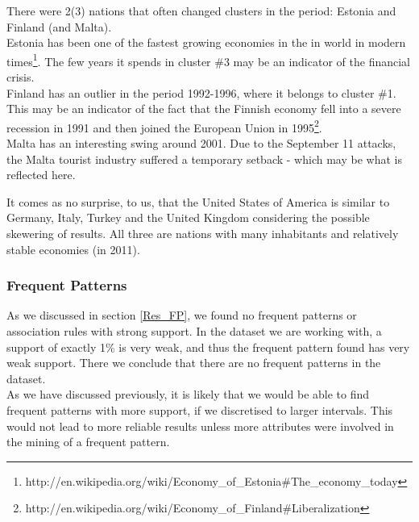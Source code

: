 There were 2(3) nations that often changed clusters in the period: Estonia and Finland (and Malta).
\\Estonia has been one of the fastest growing economies in the in world in modern times\footnote{http://en.wikipedia.org/wiki/Economy\_of\_Estonia\#The\_economy\_today}. The few years it spends in cluster \#3 may be an indicator of the financial crisis.
\\Finland has an outlier in the period 1992-1996, where it belongs to cluster \#1. This may be an indicator of the fact that the Finnish economy fell into a severe recession in 1991 and then joined the European Union in 1995\footnote{http://en.wikipedia.org/wiki/Economy\_of\_Finland\#Liberalization}.
\\Malta has an interesting swing around 2001. Due to the September 11 attacks, the Malta tourist industry suffered a temporary setback - which may be what is reflected here.

It comes as no surprise, to us, that the United States of America is similar to Germany, Italy, Turkey and the United Kingdom considering the possible skewering of results. All three are nations with many inhabitants and relatively stable economies (in 2011).

\subsubsection*{Frequent Patterns}
As we discussed in section \ref{Res_FP}, we found no frequent patterns or association rules with strong support. In the dataset we are working with, a support of exactly 1\% is very weak, and thus the frequent pattern found has very weak support. There we conclude that there are no frequent patterns in the dataset.
\\As we have discussed previously, it is likely that we would be able to find frequent patterns with more support, if we discretised to larger intervals. This would not lead to more reliable results unless more attributes were involved in the mining of a frequent pattern.